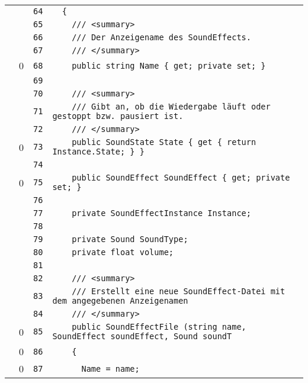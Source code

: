 \documentclass[a4paper,10pt]{article}
\begin{document}
\begin{longtable}[l]{lrrl}
\cellcolor{gray} &  & \verb~64~ & \verb~  {~\\
\cellcolor{gray} &  & \verb~65~ & \verb~    /// <summary>~\\
\cellcolor{gray} &  & \verb~66~ & \verb~    /// Der Anzeigename des SoundEffects.~\\
\cellcolor{gray} &  & \verb~67~ & \verb~    /// </summary>~\\
\cellcolor{red} & 0 & \verb~68~ & \verb~    public string Name { get; private set; }~\\
\cellcolor{gray} &  & \verb~69~ & \verb~~\\
\cellcolor{gray} &  & \verb~70~ & \verb~    /// <summary>~\\
\cellcolor{gray} &  & \verb~71~ & \verb~    /// Gibt an, ob die Wiedergabe läuft oder gestoppt bzw. pausiert ist.~\\
\cellcolor{gray} &  & \verb~72~ & \verb~    /// </summary>~\\
\cellcolor{red} & 0 & \verb~73~ & \verb~    public SoundState State { get { return Instance.State; } }~\\
\cellcolor{gray} &  & \verb~74~ & \verb~~\\
\cellcolor{red} & 0 & \verb~75~ & \verb~    public SoundEffect SoundEffect { get; private set; }~\\
\cellcolor{gray} &  & \verb~76~ & \verb~~\\
\cellcolor{gray} &  & \verb~77~ & \verb~    private SoundEffectInstance Instance;~\\
\cellcolor{gray} &  & \verb~78~ & \verb~~\\
\cellcolor{gray} &  & \verb~79~ & \verb~    private Sound SoundType;~\\
\cellcolor{gray} &  & \verb~80~ & \verb~    private float volume;~\\
\cellcolor{gray} &  & \verb~81~ & \verb~~\\
\cellcolor{gray} &  & \verb~82~ & \verb~    /// <summary>~\\
\cellcolor{gray} &  & \verb~83~ & \verb~    /// Erstellt eine neue SoundEffect-Datei mit dem angegebenen Anzeigenamen ~\\
\cellcolor{gray} &  & \verb~84~ & \verb~    /// </summary>~\\
\cellcolor{red} & 0 & \verb~85~ & \verb~    public SoundEffectFile (string name, SoundEffect soundEffect, Sound soundT~\\
\cellcolor{red} & 0 & \verb~86~ & \verb~    {~\\
\cellcolor{red} & 0 & \verb~87~ & \verb~      Name = name;~\\

\end{longtable}
\end{document}

